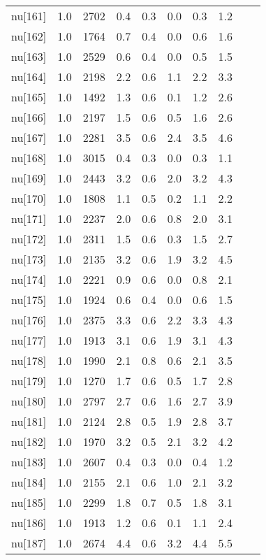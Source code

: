 \begin{longtable}{lrrrrrrr p{} | p{} |}
  nu[161] & 1.0 & 2702 & 0.4 & 0.3 & 0.0 & 0.3 & 1.2 \\ 
  nu[162] & 1.0 & 1764 & 0.7 & 0.4 & 0.0 & 0.6 & 1.6 \\ 
  nu[163] & 1.0 & 2529 & 0.6 & 0.4 & 0.0 & 0.5 & 1.5 \\ 
  nu[164] & 1.0 & 2198 & 2.2 & 0.6 & 1.1 & 2.2 & 3.3 \\ 
  nu[165] & 1.0 & 1492 & 1.3 & 0.6 & 0.1 & 1.2 & 2.6 \\ 
  nu[166] & 1.0 & 2197 & 1.5 & 0.6 & 0.5 & 1.6 & 2.6 \\ 
  nu[167] & 1.0 & 2281 & 3.5 & 0.6 & 2.4 & 3.5 & 4.6 \\ 
  nu[168] & 1.0 & 3015 & 0.4 & 0.3 & 0.0 & 0.3 & 1.1 \\ 
  nu[169] & 1.0 & 2443 & 3.2 & 0.6 & 2.0 & 3.2 & 4.3 \\ 
  nu[170] & 1.0 & 1808 & 1.1 & 0.5 & 0.2 & 1.1 & 2.2 \\ 
  nu[171] & 1.0 & 2237 & 2.0 & 0.6 & 0.8 & 2.0 & 3.1 \\ 
  nu[172] & 1.0 & 2311 & 1.5 & 0.6 & 0.3 & 1.5 & 2.7 \\ 
  nu[173] & 1.0 & 2135 & 3.2 & 0.6 & 1.9 & 3.2 & 4.5 \\ 
  nu[174] & 1.0 & 2221 & 0.9 & 0.6 & 0.0 & 0.8 & 2.1 \\ 
  nu[175] & 1.0 & 1924 & 0.6 & 0.4 & 0.0 & 0.6 & 1.5 \\ 
  nu[176] & 1.0 & 2375 & 3.3 & 0.6 & 2.2 & 3.3 & 4.3 \\ 
  nu[177] & 1.0 & 1913 & 3.1 & 0.6 & 1.9 & 3.1 & 4.3 \\ 
  nu[178] & 1.0 & 1990 & 2.1 & 0.8 & 0.6 & 2.1 & 3.5 \\ 
  nu[179] & 1.0 & 1270 & 1.7 & 0.6 & 0.5 & 1.7 & 2.8 \\ 
  nu[180] & 1.0 & 2797 & 2.7 & 0.6 & 1.6 & 2.7 & 3.9 \\ 
  nu[181] & 1.0 & 2124 & 2.8 & 0.5 & 1.9 & 2.8 & 3.7 \\ 
  nu[182] & 1.0 & 1970 & 3.2 & 0.5 & 2.1 & 3.2 & 4.2 \\ 
  nu[183] & 1.0 & 2607 & 0.4 & 0.3 & 0.0 & 0.4 & 1.2 \\ 
  nu[184] & 1.0 & 2155 & 2.1 & 0.6 & 1.0 & 2.1 & 3.2 \\ 
  nu[185] & 1.0 & 2299 & 1.8 & 0.7 & 0.5 & 1.8 & 3.1 \\ 
  nu[186] & 1.0 & 1913 & 1.2 & 0.6 & 0.1 & 1.1 & 2.4 \\ 
  nu[187] & 1.0 & 2674 & 4.4 & 0.6 & 3.2 & 4.4 & 5.5 \\ 

\end{longtable}
